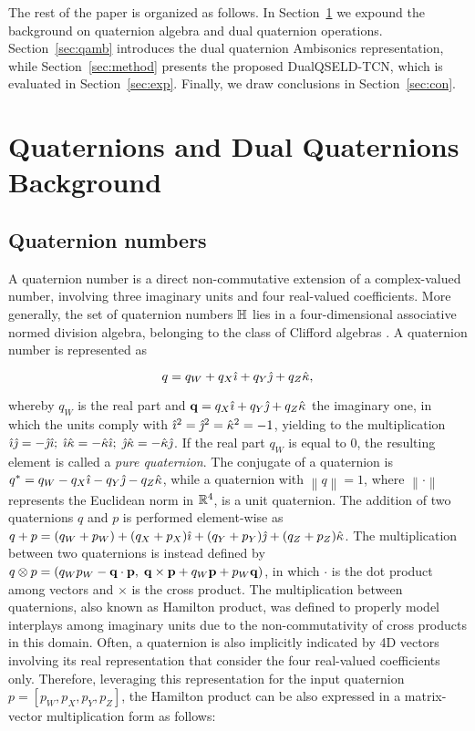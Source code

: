 \documentclass[3p, preprint, twocolumn]{elsarticle}
\begin{document}
The rest of the paper is organized as follows. In Section~\ref{sec:qnn} we expound the background on quaternion algebra and dual quaternion operations. Section~\ref{sec:qamb} introduces the dual quaternion Ambisonics representation, while Section~\ref{sec:method} presents the proposed DualQSELD-TCN, which is evaluated in Section~\ref{sec:exp}. Finally, we draw conclusions in Section~\ref{sec:con}.


\section{Quaternions and Dual Quaternions Background}
\label{sec:qnn}

\subsection{Quaternion numbers}

A quaternion number is a direct non-commutative extension of a complex-valued number, involving three imaginary units and four real-valued coefficients. More generally, the set of quaternion numbers $\mathbb{H}$ lies in a four-dimensional associative normed division algebra, belonging to the class of Clifford algebras \cite{Ward1997}. A quaternion number is represented as

\begin{equation}
\label{eq:quaternion}
    q = q_W + q_X {\hat{\imath}} + q_Y {\hat{\jmath}} + q_Z {\hat{\kappa}},
\end{equation}

\noindent whereby $q_W$ is the real part and ${\mathbf q} = q_X {\hat{\imath}} + q_Y {\hat{\jmath}} + q_Z {\hat{\kappa}}$ the imaginary one, in which the units comply with ${\hat{\imath}}^2 = {\hat{\jmath}}^2 = {\hat{\kappa}}^2 = -1$, yielding to the multiplication ${\hat{\imath}} {\hat{\jmath}} = - {\hat{\jmath}} {\hat{\imath}}; \; {\hat{\imath}} {\hat{\kappa}} = - {\hat{\kappa}} {\hat{\imath}}; \; {\hat{\jmath}} {\hat{\kappa}} = - {\hat{\kappa}} {\hat{\jmath}}$. If the real part $q_W$ is equal to $0$, the resulting element is called a \textit{pure quaternion}. The conjugate of a quaternion is $q^* = q_W - q_X {\hat{\imath}} - q_Y {\hat{\jmath}} - q_Z {\hat{\kappa}}$, while a quaternion with $\left\|q\right\|=1$, where $\left\|\cdot\right\|$ represents the Euclidean norm in $\mathbb{R}^4$, is a unit quaternion. The addition of two quaternions $q$ and $p$ is performed element-wise as $q+p = (q_W + p_W) + (q_X + p_X) {\hat{\imath}} + (q_Y + p_Y) {\hat{\jmath}} + (q_Z + p_Z) {\hat{\kappa}}$. The multiplication between two quaternions is instead defined by $q \otimes p = (q_W p_W - {\mathbf q} \cdot {\mathbf p}, \; {\mathbf q} \times {\mathbf p} + q_W {\mathbf p} + p_W {\mathbf q})$, in which $\cdot$ is the dot product among vectors and $\times$ is the cross product. The multiplication between quaternions, also known as Hamilton product, was defined to properly model interplays among imaginary units due to the non-commutativity of cross products in this domain. Often, a quaternion is also implicitly indicated by 4D vectors involving its real representation that consider the four real-valued coefficients only. Therefore, leveraging this representation for the input quaternion $p = [p_W, p_X, p_Y, p_Z]$, the Hamilton product can be also expressed in a matrix-vector multiplication form as follows:
\end{document}
